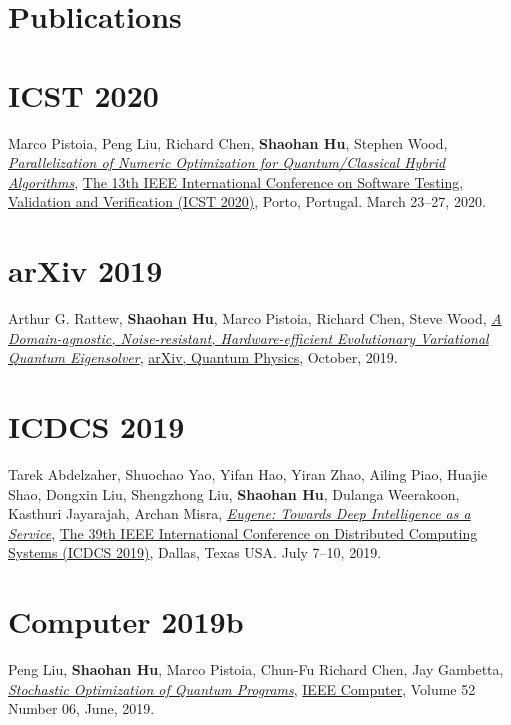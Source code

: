 \section{\sc Publications}

\section{\sc ICST 2020}\hypertarget{pistoia2020icst}{}
Marco Pistoia, Peng Liu, Richard Chen, \textbf{Shaohan Hu}, Stephen Wood,
\href{}{\emph{Parallelization of Numeric Optimization for Quantum/Classical Hybrid Algorithms}},
\href{https://icst2020.info/}{\textsf{The 13th IEEE International Conference on Software Testing, Validation and Verification (ICST 2020)}},
Porto, Portugal. March 23--27, 2020.

\section{\sc arXiv 2019}\hypertarget{rattew2019arxiv}{}
Arthur G. Rattew, \textbf{Shaohan Hu}, Marco Pistoia, Richard Chen, Steve Wood,
\href{}{\emph{A Domain-agnostic, Noise-resistant, Hardware-efficient Evolutionary Variational Quantum Eigensolver}},
\href{https://arxiv.org/abs/1910.09694}{\textsf{arXiv, Quantum Physics}},
October, 2019.

\section{\sc ICDCS 2019}\hypertarget{abdelzaher2019icdcs}{}
Tarek Abdelzaher, Shuochao Yao, Yifan Hao, Yiran Zhao, Ailing Piao, Huajie Shao, Dongxin Liu, Shengzhong Liu, \textbf{Shaohan Hu}, Dulanga Weerakoon, Kasthuri Jayarajah, Archan Misra,
\href{}{\emph{Eugene: Towards Deep Intelligence as a Service}},
\href{https://theory.utdallas.edu/ICDCS2019/}{\textsf{The 39th IEEE International Conference on Distributed Computing Systems (ICDCS 2019)}},
Dallas, Texas USA. July 7--10, 2019.

\section{\sc Computer 2019b}\hypertarget{liu2019computer}{}
Peng Liu, \textbf{Shaohan Hu}, Marco Pistoia, Chun-Fu Richard Chen, Jay Gambetta,
\href{https://doi.ieeecomputersociety.org/10.1109/MC.2019.2909711}{\emph{Stochastic Optimization of Quantum Programs}},
\href{https://www.computer.org/csdl/magazines/co}{\textsf{IEEE Computer}},
Volume 52 Number 06, June, 2019.

